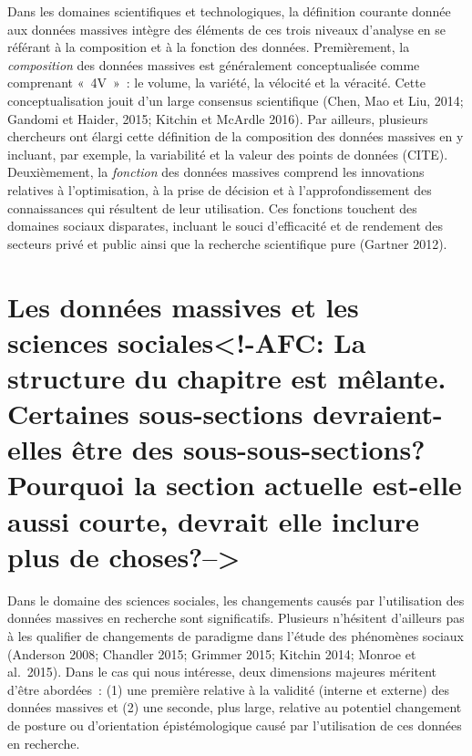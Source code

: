 \documentclass[
  letterpaper,
]{scrbook}
\begin{document}
Dans les domaines scientifiques et technologiques, la définition
courante donnée aux données massives intègre des éléments de ces trois
niveaux d'analyse en se référant à la composition et à la fonction des
données. Premièrement, la \emph{composition} des données massives est
généralement conceptualisée comme comprenant «~4V~»~: le volume, la
variété, la vélocité et la véracité. Cette conceptualisation jouit d'un
large consensus scientifique (Chen, Mao et Liu, 2014; Gandomi et Haider,
2015; Kitchin et McArdle 2016). Par ailleurs, plusieurs chercheurs ont
élargi cette définition de la composition des données massives en y
incluant, par exemple, la variabilité et la valeur des points de données
(CITE). Deuxièmement, la \emph{fonction} des données massives comprend
les innovations relatives à l'optimisation, à la prise de décision et à
l'approfondissement des connaissances qui résultent de leur utilisation.
Ces fonctions touchent des domaines sociaux disparates, incluant le
souci d'efficacité et de rendement des secteurs privé et public ainsi
que la recherche scientifique pure (Gartner 2012).

\hypertarget{les-donnuxe9es-massives-et-les-sciences-sociales-afc-la-structure-du-chapitre-est-muxealante.-certaines-sous-sections-devraient-elles-uxeatre-des-sous-sous-sections-pourquoi-la-section-actuelle-est-elle-aussi-courte-devrait-elle-inclure-plus-de-choses}{%
\section{Les données massives et les sciences sociales\textless!-AFC: La
structure du chapitre est mêlante. Certaines sous-sections
devraient-elles être des sous-sous-sections? Pourquoi la section
actuelle est-elle aussi courte, devrait elle inclure plus de
choses?--\textgreater{}}\label{les-donnuxe9es-massives-et-les-sciences-sociales-afc-la-structure-du-chapitre-est-muxealante.-certaines-sous-sections-devraient-elles-uxeatre-des-sous-sous-sections-pourquoi-la-section-actuelle-est-elle-aussi-courte-devrait-elle-inclure-plus-de-choses}}

Dans le domaine des sciences sociales, les changements causés par
l'utilisation des données massives en recherche sont significatifs.
Plusieurs n'hésitent d'ailleurs pas à les qualifier de changements de
paradigme dans l'étude des phénomènes sociaux (Anderson 2008; Chandler
2015; Grimmer 2015; Kitchin 2014; Monroe et al.~2015). Dans le cas qui
nous intéresse, deux dimensions majeures méritent d'être abordées~: (1)
une première relative à la validité (interne et externe) des données
massives et (2) une seconde, plus large, relative au potentiel
changement de posture ou d'orientation épistémologique causé par
l'utilisation de ces données en recherche.
\end{document}
